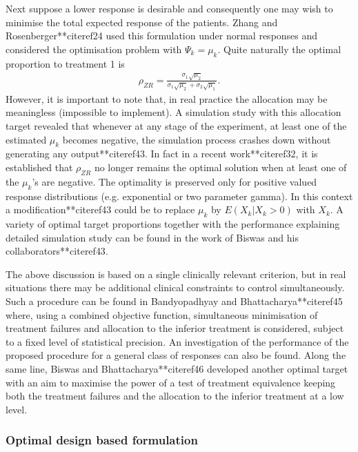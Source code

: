 Next suppose a lower response is desirable and consequently one may
wish to minimise the total expected response of the patients. Zhang
and Rosenberger**citeref{24} used this formulation under normal responses
and considered the optimisation problem with $\Psi_{k}=\mu_{k}$.
Quite naturally the optimal proportion to treatment 1 is
\begin{eqnarray*}
\rho_{ZR}=\frac{\sigma_{1}\sqrt{\mu_{2}}}{\sigma_{1}\sqrt{\mu_{2}}+\sigma_{2}\sqrt{\mu_{1}}}.
\end{eqnarray*}
However, it is important to note that, in real practice the
allocation may be meaningless (impossible to implement). A simulation study with this allocation target revealed that  whenever at any stage of the experiment, at least one of
the estimated $\mu_{k}$ becomes negative, the simulation process crashes down without generating any output**citeref{43}. In fact in a recent work**citeref{32}, it is established that $\rho_{ZR}$
no longer remains the optimal solution when at least one of the
$\mu_{k}$'s are negative. The optimality is preserved only for positive valued response
distributions (e.g. exponential or two parameter gamma). In
this context a modification**citeref{43} could be to replace $\mu_{k}$ by $E(X_{k}|X_{k}>0)$ with $X_{k}$. A variety of optimal target proportions together with the performance explaining detailed simulation study
can be found in the work of Biswas and his collaborators**citeref{43}.

The above discussion is based on a single clinically relevant criterion, but in real situations there may be additional clinical constraints to control simultaneously. Such a procedure can be found in Bandyopadhyay and Bhattacharya**citeref{45} where, using a combined objective function, simultaneous minimisation of treatment failures and allocation to the inferior treatment is considered, subject to a fixed level of statistical precision. An investigation of the performance of the proposed procedure for a general class of responses can also be found. Along the same line, Biswas and Bhattacharya**citeref{46} developed another optimal target with an aim to maximise the power of a test of treatment equivalence keeping both the treatment failures and the allocation to the inferior treatment at a low level.

\subsubsection{Optimal design based formulation}

